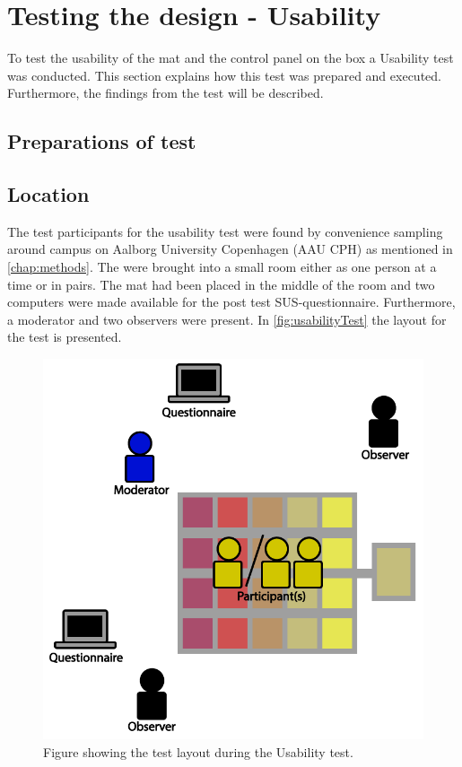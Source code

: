 



\section{Testing the design - Usability}
To test the usability of the mat and the control panel on the box a Usability test was conducted. This section explains how this test was prepared and executed. Furthermore, the findings from the test will be described.

\subsection{Preparations of test}


\subsection{Location}
The test participants for the usability test were found by convenience sampling around campus on Aalborg University Copenhagen (AAU CPH) as mentioned in \ref{chap:methods}. The were brought into a small room either as one person at a time or in pairs. The mat had been placed in the middle of the room and two computers were made available for the post test SUS-questionnaire. Furthermore, a moderator and two observers were present. In \autoref{fig:usabilityTest} the layout for the test is presented.

\begin{figure}[H]
	\centering
	\includegraphics[width=0.7\linewidth]{figure/Design/usability}
	\caption{Figure showing the test layout during the Usability test.}	
	\label{fig:usabilityTest}
\end{figure}

